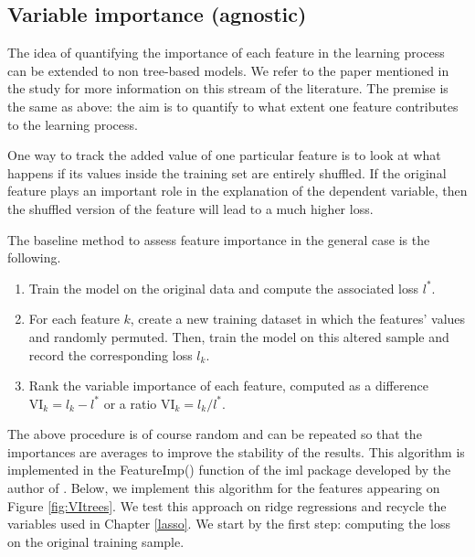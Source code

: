 \documentclass[]{krantz}
\providecommand{\tightlist}{%
  \setlength{\itemsep}{0pt}\setlength{\parskip}{0pt}}
\theoremstyle{definition}
\theoremstyle{definition}
\theoremstyle{definition}
\theoremstyle{remark}
\begin{document}
\hypertarget{variable-importance-agnostic}{%
\subsection{Variable importance
(agnostic)}\label{variable-importance-agnostic}}

The idea of quantifying the importance of each feature in the learning
process can be extended to non tree-based models. We refer to the paper
mentioned in the study \citet{fisher2018all} for more information on
this stream of the literature. The premise is the same as above: the aim
is to quantify to what extent one feature contributes to the learning
process.

One way to track the added value of one particular feature is to look at
what happens if its values inside the training set are entirely
shuffled. If the original feature plays an important role in the
explanation of the dependent variable, then the shuffled version of the
feature will lead to a much higher loss.

The baseline method to assess feature importance in the general case is
the following.

\begin{enumerate}
\def\labelenumi{\arabic{enumi}.}
\tightlist
\item
  Train the model on the original data and compute the associated loss
  \(l^*\).\\
\item
  For each feature \(k\), create a new training dataset in which the
  features' values and randomly permuted. Then, train the model on this
  altered sample and record the corresponding loss \(l_k\).\\
\item
  Rank the variable importance of each feature, computed as a difference
  \(\text{VI}_k=l_k-l^*\) or a ratio \(\text{VI}_k=l_k/l^*\).
\end{enumerate}

The above procedure is of course random and can be repeated so that the
importances are averages to improve the stability of the results. This
algorithm is implemented in the FeatureImp() function of the iml package
developed by the author of \citet{molnar2019interpretable}. Below, we
implement this algorithm for the features appearing on Figure
\ref{fig:VItrees}. We test this approach on ridge regressions and
recycle the variables used in Chapter \ref{lasso}. We start by the first
step: computing the loss on the original training sample.
\end{document}
